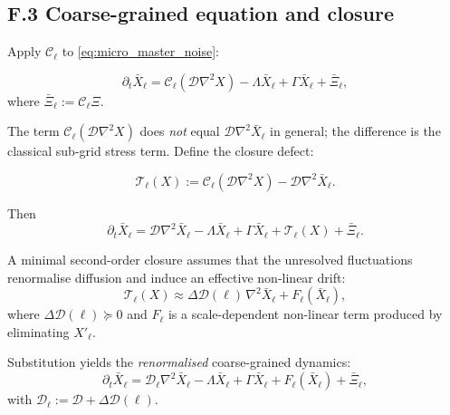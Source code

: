\documentclass[12pt,a4paper]{article}
\theoremstyle{definition}
\begin{document}
\subsection*{F.3 Coarse-grained equation and closure}

Apply $\mathcal{C}_\ell$ to \eqref{eq:micro_master_noise}:

\begin{equation}
  \partial_t \bar{X}_\ell
  =
  \mathcal{C}_\ell(\mathcal{D}\nabla^2 X)
  - \Lambda \bar{X}_\ell
  + \Gamma \bar{X}_\ell
  + \bar{\Xi}_\ell,
  \label{eq:coarse_before_closure}
\end{equation}
where $\bar{\Xi}_\ell := \mathcal{C}_\ell \Xi$.

The term $\mathcal{C}_\ell(\mathcal{D}\nabla^2 X)$ does \emph{not} equal $\mathcal{D}\nabla^2 \bar{X}_\ell$
in general; the difference is the classical sub-grid stress term.  Define the closure defect:

\begin{equation}
  \mathcal{T}_\ell(X)
  :=
  \mathcal{C}_\ell(\mathcal{D}\nabla^2 X) - \mathcal{D}\nabla^2 \bar{X}_\ell.
  \label{eq:closure_defect}
\end{equation}

Then
\begin{equation}
  \partial_t \bar{X}_\ell
  =
  \mathcal{D}\nabla^2 \bar{X}_\ell
  - \Lambda \bar{X}_\ell
  + \Gamma \bar{X}_\ell
  + \mathcal{T}_\ell(X)
  + \bar{\Xi}_\ell.
  \label{eq:coarse_master}
\end{equation}

A minimal second-order closure assumes that the unresolved fluctuations renormalise diffusion
and induce an effective non-linear drift:
\begin{equation}
  \mathcal{T}_\ell(X)
  \approx
  \Delta \mathcal{D}(\ell)\,\nabla^2 \bar{X}_\ell
  +
  F_\ell(\bar{X}_\ell),
  \label{eq:closure_ansatz}
\end{equation}
where $\Delta\mathcal{D}(\ell)\succeq 0$ and $F_\ell$ is a scale-dependent non-linear term produced by
eliminating $X'_\ell$.

Substitution yields the \emph{renormalised} coarse-grained dynamics:
\begin{equation}
  \partial_t \bar{X}_\ell
  =
  \mathcal{D}_\ell \nabla^2 \bar{X}_\ell
  - \Lambda \bar{X}_\ell
  + \Gamma \bar{X}_\ell
  + F_\ell(\bar{X}_\ell)
  + \bar{\Xi}_\ell,
  \label{eq:renorm_master}
\end{equation}
with $\mathcal{D}_\ell := \mathcal{D} + \Delta\mathcal{D}(\ell)$.
\end{document}
